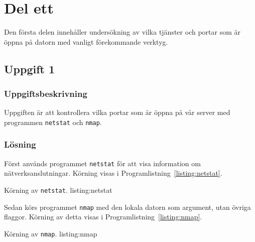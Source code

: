 %
%
%


\section{Del ett}
Den första delen innehåller undersökning av vilka tjänster och portar som är öppna
på datorn med vanligt förekommande verktyg.


\subsection{Uppgift 1}
\subsubsection{Uppgiftsbeskrivning}
Uppgiften är att kontrollera vilka portar som är öppna på vår server med
programmen \texttt{netstat} och \texttt{nmap}.


\subsubsection{Lösning}
Först används programmet \texttt{netstat} för att visa information om
nätverksanslutningar. Körning visas i Programlistning~\ref{listing:netstat}.

            {Körning av \texttt{netstat}.}
            {listing:netstat}


Sedan körs programmet \texttt{nmap} med den lokala datorn som argument, utan
övriga flaggor. Körning av detta visas i Programlistning~\ref{listing:nmap}.

            {Körning av \texttt{nmap}.}
            {listing:nmap}


